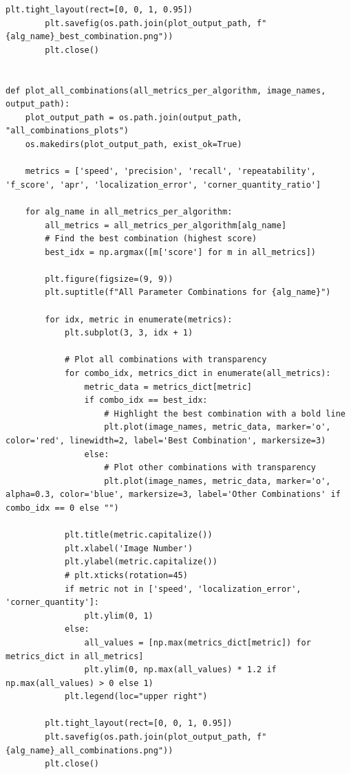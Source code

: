 \documentclass[journal]{IEEEtran}
\begin{document}
\begin{lstlisting}[style=python, caption={Utility Functions for Data Processing}, label={lst:utilities}]
        plt.tight_layout(rect=[0, 0, 1, 0.95])
        plt.savefig(os.path.join(plot_output_path, f"{alg_name}_best_combination.png"))
        plt.close()
        

def plot_all_combinations(all_metrics_per_algorithm, image_names, output_path):
    plot_output_path = os.path.join(output_path, "all_combinations_plots")
    os.makedirs(plot_output_path, exist_ok=True)
    
    metrics = ['speed', 'precision', 'recall', 'repeatability', 'f_score', 'apr', 'localization_error', 'corner_quantity_ratio']
    
    for alg_name in all_metrics_per_algorithm:
        all_metrics = all_metrics_per_algorithm[alg_name]
        # Find the best combination (highest score)
        best_idx = np.argmax([m['score'] for m in all_metrics])
        
        plt.figure(figsize=(9, 9))
        plt.suptitle(f"All Parameter Combinations for {alg_name}")
        
        for idx, metric in enumerate(metrics):
            plt.subplot(3, 3, idx + 1)
            
            # Plot all combinations with transparency
            for combo_idx, metrics_dict in enumerate(all_metrics):
                metric_data = metrics_dict[metric]
                if combo_idx == best_idx:
                    # Highlight the best combination with a bold line
                    plt.plot(image_names, metric_data, marker='o', color='red', linewidth=2, label='Best Combination', markersize=3)
                else:
                    # Plot other combinations with transparency
                    plt.plot(image_names, metric_data, marker='o', alpha=0.3, color='blue', markersize=3, label='Other Combinations' if combo_idx == 0 else "")
            
            plt.title(metric.capitalize())
            plt.xlabel('Image Number')
            plt.ylabel(metric.capitalize())
            # plt.xticks(rotation=45)
            if metric not in ['speed', 'localization_error', 'corner_quantity']:
                plt.ylim(0, 1)
            else:
                all_values = [np.max(metrics_dict[metric]) for metrics_dict in all_metrics]
                plt.ylim(0, np.max(all_values) * 1.2 if np.max(all_values) > 0 else 1)
            plt.legend(loc="upper right")
        
        plt.tight_layout(rect=[0, 0, 1, 0.95])
        plt.savefig(os.path.join(plot_output_path, f"{alg_name}_all_combinations.png"))
        plt.close()
        


\end{lstlisting}
\end{document}
